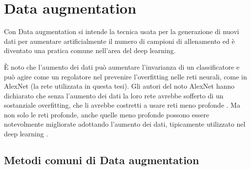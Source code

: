 \chapter{Data augmentation}\label{data-augmentation}

Con Data augmentation si intende la tecnica usata per la generazione di nuovi dati  per aumentare artificialmente il numero di campioni di allenamento ed è diventato una pratica comune nell'area del deep learning.

È noto che l'aumento dei dati può aumentare l'invarianza di un classificatore e può agire come un regolatore nel prevenire l'overfitting nelle reti neurali, come in AlexNet (la rete utilizzata in questa tesi). Gli autori del noto AlexNet  hanno dichiarato che senza l'aumento dei dati la loro rete avrebbe sofferto di un sostanziale overfitting, che li avrebbe costretti a usare reti meno profonde \cite{alexnet}. Ma non solo le reti profonde, anche quelle meno profonde  possono essere notevolmente migliorate adottando l'aumento dei dati, tipicamente utilizzato nel deep learning \cite{dataaugmentation}.


\section{Metodi comuni di Data augmentation}\label{metodi-comuni-di-data-augmentation}

